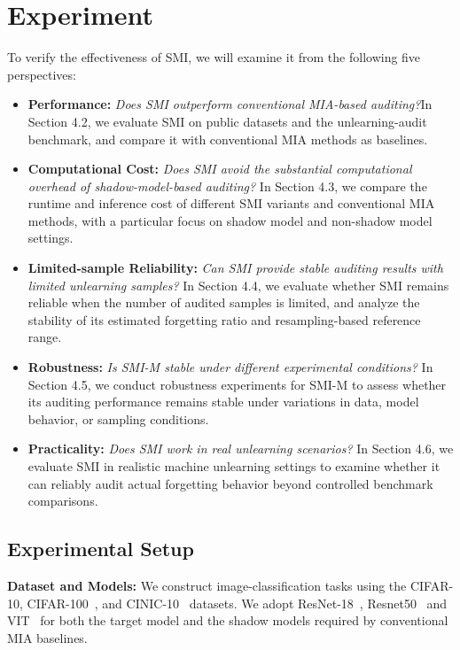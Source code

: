 \documentclass{article}
\theoremstyle{plain}
\theoremstyle{definition}
\theoremstyle{remark}
\begin{document}
\section{Experiment}
To verify the effectiveness of SMI, we will examine it from the following five perspectives:
\begin{itemize}
\item[1.] \textbf{Performance:} \textit{Does SMI outperform conventional MIA-based auditing?}In Section 4.2, we evaluate SMI on public datasets and the unlearning-audit benchmark, and compare it with conventional MIA methods as baselines.
\item[2.] \textbf{Computational Cost:} \textit{Does SMI avoid the substantial computational overhead of shadow-model-based auditing?}
In Section 4.3, we compare the runtime and inference cost of different SMI variants and conventional MIA methods, with a particular focus on shadow model and non-shadow model settings.
\item[3.] \textbf{Limited-sample Reliability:} \textit{Can SMI provide stable auditing results with limited unlearning samples?}
In Section 4.4, we evaluate whether SMI remains reliable when the number of audited samples is limited, and analyze the stability of its estimated forgetting ratio and resampling-based reference range.
\item[4.] \textbf{Robustness:} \textit{Is SMI-M stable under different experimental conditions?}
In Section 4.5, we conduct robustness experiments for SMI-M to assess whether its auditing performance remains stable under variations in data, model behavior, or sampling conditions.
\item[5.] \textbf{Practicality:} \textit{Does SMI work in real unlearning scenarios?}
In Section 4.6, we evaluate SMI in realistic machine unlearning settings to examine whether it can reliably audit actual forgetting behavior beyond controlled benchmark comparisons.
\end{itemize}
\subsection{Experimental Setup}
\textbf{Dataset and Models:} We construct image-classification tasks using the CIFAR-10, CIFAR-100~\cite{Cifar}, and CINIC-10~\cite{cinic} datasets. We adopt ResNet-18~\cite{renset18}, Resnet50~\cite{RESNET50} and VIT~\cite{vit} for both the target model and the shadow models required by conventional MIA baselines.
\end{document}
